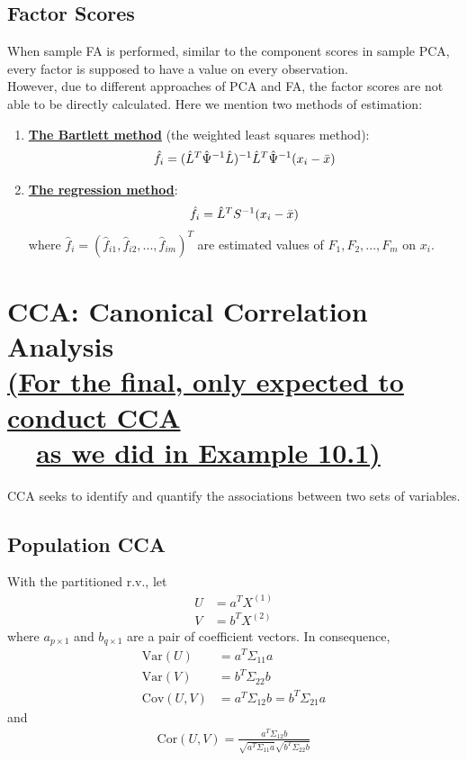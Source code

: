 \documentclass[12pt]{extarticle}
\newcommand{\<}{\langle}
\renewcommand{\>}{\rangle}
\theoremstyle{definition}
\begin{document}
\subsection{Factor Scores}
When sample FA is performed, similar to the component scores in sample PCA, every factor is supposed to have a value on every observation.\\
However, due to different approaches of PCA and FA, the factor scores are not able to be directly calculated. Here we mention two methods of estimation:

\begin{tcolorbox}[enhanced, drop fuzzy shadow, title=Methods of Factor Scoring]
\begin{enumerate}
    \item \underline{\textbf{The Bartlett method}} (the weighted least squares method):
    \begin{align*}
        \hat{f}_i =(\hat{L}^T \hat{\Psi}^{-1} \hat{L})^{-1} \hat{L}^T \hat{\Psi}^{-1} (x_i -\Bar{x})
    \end{align*}
    \item \underline{\textbf{The regression method}}:
    \begin{align*}
        \hat{f}_i = \hat{L}^T S^{-1} (x_i -\Bar{x})
    \end{align*}
    where $\hat{f}_i = (\hat{f}_{i1},\hat{f}_{i2},...,\hat{f}_{im})^T$ are estimated values of $F_1,F_2,...,F_m$ on $x_i$.
\end{enumerate}
\end{tcolorbox}

\newpage
\section{CCA: Canonical Correlation Analysis\\
\underline{(For the final, only expected to conduct CCA}\\
\ \ \underline{as we did in Example 10.1)}}
CCA seeks to identify and quantify the associations between two sets of variables.
\subsection{Population CCA}
With the partitioned r.v., let
\begin{align*}
    U &= a^T X^{(1)}\\
    V &= b^T X^{(2)}
\end{align*}
where $a_{p\times 1}$ and $b_{q\times 1}$ are a pair of coefficient vectors. In consequence,
\begin{align*}
    \text{Var}(U) &= a^T \Sigma_{11} a\\
    \text{Var}(V) &= b^T \Sigma_{22} b\\
    \text{Cov}(U,V) &= a^T \Sigma_{12} b = b^T \Sigma_{21} a
\end{align*}
and
\begin{align*}
    \text{Cor}(U,V) = \frac{a^T \Sigma_{12} b}{\sqrt{a^T \Sigma_{11} a}\sqrt{b^T \Sigma_{22} b}}
\end{align*}
\end{document}
